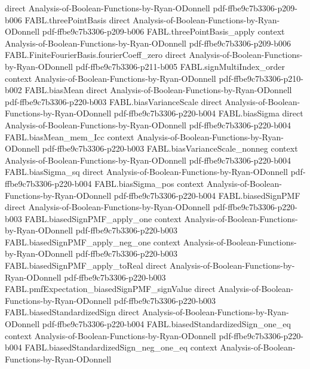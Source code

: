 \begin{theorem}
  {direct}
  {Analysis-of-Boolean-Functions-by-Ryan-ODonnell}
  {pdf-ffbe9c7b3306-p209-b006}
\proofstep
  {FABL.threePointBasis}
  {direct}
  {Analysis-of-Boolean-Functions-by-Ryan-ODonnell}
  {pdf-ffbe9c7b3306-p209-b006}
\proofstep
  {FABL.threePointBasis_apply}
  {context}
  {Analysis-of-Boolean-Functions-by-Ryan-ODonnell}
  {pdf-ffbe9c7b3306-p209-b006}
\proofstep
  {FABL.FiniteFourierBasis.fourierCoeff_zero}
  {direct}
  {Analysis-of-Boolean-Functions-by-Ryan-ODonnell}
  {pdf-ffbe9c7b3306-p211-b005}
\proofstep
  {FABL.signMultiIndex_order}
  {context}
  {Analysis-of-Boolean-Functions-by-Ryan-ODonnell}
  {pdf-ffbe9c7b3306-p210-b002}
\proofstep
  {FABL.biasMean}
  {direct}
  {Analysis-of-Boolean-Functions-by-Ryan-ODonnell}
  {pdf-ffbe9c7b3306-p220-b003}
\proofstep
  {FABL.biasVarianceScale}
  {direct}
  {Analysis-of-Boolean-Functions-by-Ryan-ODonnell}
  {pdf-ffbe9c7b3306-p220-b004}
\proofstep
  {FABL.biasSigma}
  {direct}
  {Analysis-of-Boolean-Functions-by-Ryan-ODonnell}
  {pdf-ffbe9c7b3306-p220-b004}
\proofstep
  {FABL.biasMean_mem_Icc}
  {context}
  {Analysis-of-Boolean-Functions-by-Ryan-ODonnell}
  {pdf-ffbe9c7b3306-p220-b003}
\proofstep
  {FABL.biasVarianceScale_nonneg}
  {context}
  {Analysis-of-Boolean-Functions-by-Ryan-ODonnell}
  {pdf-ffbe9c7b3306-p220-b004}
\proofstep
  {FABL.biasSigma_sq}
  {direct}
  {Analysis-of-Boolean-Functions-by-Ryan-ODonnell}
  {pdf-ffbe9c7b3306-p220-b004}
\proofstep
  {FABL.biasSigma_pos}
  {context}
  {Analysis-of-Boolean-Functions-by-Ryan-ODonnell}
  {pdf-ffbe9c7b3306-p220-b004}
\proofstep
  {FABL.biasedSignPMF}
  {direct}
  {Analysis-of-Boolean-Functions-by-Ryan-ODonnell}
  {pdf-ffbe9c7b3306-p220-b003}
\proofstep
  {FABL.biasedSignPMF_apply_one}
  {context}
  {Analysis-of-Boolean-Functions-by-Ryan-ODonnell}
  {pdf-ffbe9c7b3306-p220-b003}
\proofstep
  {FABL.biasedSignPMF_apply_neg_one}
  {context}
  {Analysis-of-Boolean-Functions-by-Ryan-ODonnell}
  {pdf-ffbe9c7b3306-p220-b003}
\proofstep
  {FABL.biasedSignPMF_apply_toReal}
  {direct}
  {Analysis-of-Boolean-Functions-by-Ryan-ODonnell}
  {pdf-ffbe9c7b3306-p220-b003}
\proofstep
  {FABL.pmfExpectation_biasedSignPMF_signValue}
  {direct}
  {Analysis-of-Boolean-Functions-by-Ryan-ODonnell}
  {pdf-ffbe9c7b3306-p220-b003}
\proofstep
  {FABL.biasedStandardizedSign}
  {direct}
  {Analysis-of-Boolean-Functions-by-Ryan-ODonnell}
  {pdf-ffbe9c7b3306-p220-b004}
\proofstep
  {FABL.biasedStandardizedSign_one_eq}
  {context}
  {Analysis-of-Boolean-Functions-by-Ryan-ODonnell}
  {pdf-ffbe9c7b3306-p220-b004}
\proofstep
  {FABL.biasedStandardizedSign_neg_one_eq}
  {context}
  {Analysis-of-Boolean-Functions-by-Ryan-ODonnell}

\end{theorem}
